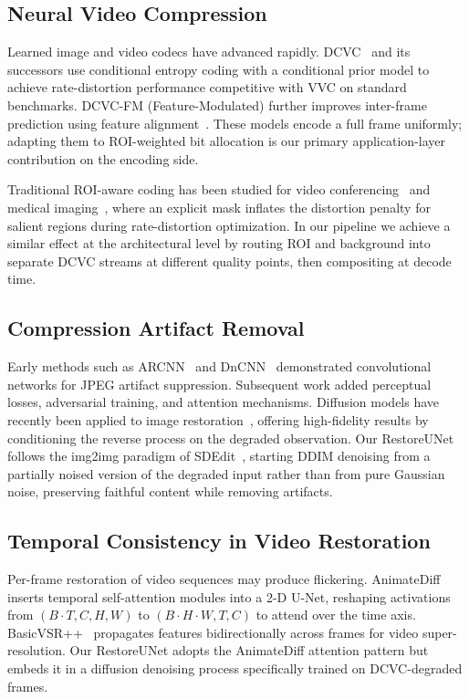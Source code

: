 \documentclass[10pt, conference]{IEEEtran}
\begin{document}
\subsection{Neural Video Compression}

Learned image and video codecs have advanced rapidly. DCVC~\cite{Li_2023_DCVC} and its successors use conditional entropy coding with a conditional prior model to achieve rate-distortion performance competitive with VVC on standard benchmarks. DCVC-FM (Feature-Modulated) further improves inter-frame prediction using feature alignment~\cite{Li_2024_DCVC_FM}. These models encode a full frame uniformly; adapting them to ROI-weighted bit allocation is our primary application-layer contribution on the encoding side.

Traditional ROI-aware coding has been studied for video conferencing~\cite{Hadizadeh_2014_ROI} and medical imaging~\cite{Sanchez_2008_ROI_Medical}, where an explicit mask inflates the distortion penalty for salient regions during rate-distortion optimization. In our pipeline we achieve a similar effect at the architectural level by routing ROI and background into separate DCVC streams at different quality points, then compositing at decode time.

\subsection{Compression Artifact Removal}

Early methods such as ARCNN~\cite{Dong_2015_ARCNN} and DnCNN~\cite{Zhang_2017_DnCNN} demonstrated convolutional networks for JPEG artifact suppression. Subsequent work added perceptual losses, adversarial training, and attention mechanisms. Diffusion models have recently been applied to image restoration~\cite{Saharia_2022_SR3, Whang_2022_Deblurring}, offering high-fidelity results by conditioning the reverse process on the degraded observation. Our RestoreUNet follows the img2img paradigm of SDEdit~\cite{Meng_2021_SDEdit}, starting DDIM denoising from a partially noised version of the degraded input rather than from pure Gaussian noise, preserving faithful content while removing artifacts.

\subsection{Temporal Consistency in Video Restoration}

Per-frame restoration of video sequences may produce flickering. AnimateDiff~\cite{Guo_2023_AnimateDiff} inserts temporal self-attention modules into a 2-D U-Net, reshaping activations from \((B \cdot T, C, H, W)\) to \((B \cdot H \cdot W, T, C)\) to attend over the time axis. BasicVSR++~\cite{Chan_2022_BasicVSR} propagates features bidirectionally across frames for video super-resolution. Our RestoreUNet adopts the AnimateDiff attention pattern but embeds it in a diffusion denoising process specifically trained on DCVC-degraded frames.
\end{document}
